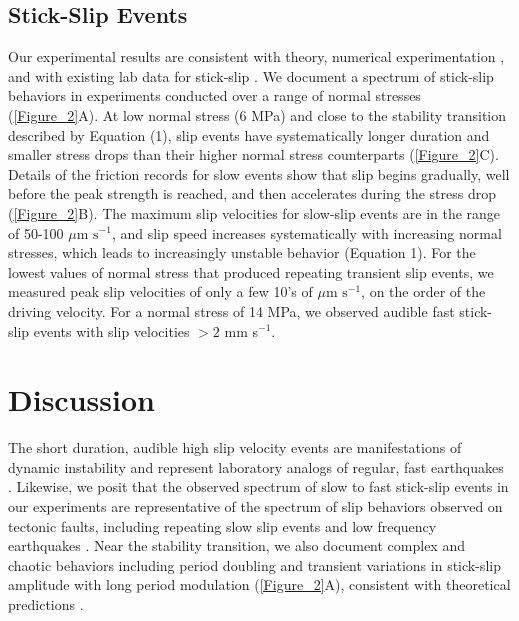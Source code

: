 \subsection{Stick-Slip Events}
Our experimental results are consistent with theory, numerical experimentation \cite{liu2007spontaneous,gu1984slip}, and with existing lab data for stick-slip \cite{Brace_1966}. We document a spectrum of stick-slip behaviors in experiments conducted over a range of normal stresses (\ref{Figure_2}A). At low normal stress (6 MPa) and close to the stability transition described by Equation (1), slip events have systematically longer duration and smaller stress drops than their higher normal stress counterparts (\ref{Figure_2}C). Details of the friction records for slow events show that slip begins gradually, well before the peak strength is reached, and then accelerates during the stress drop (\ref{Figure_2}B).  The maximum slip velocities for slow-slip events are in the range of 50-100 $\mu \text{m s}^{-1}$, and slip speed increases systematically with increasing normal stresses, which leads to increasingly unstable behavior (Equation 1).  For the lowest values of normal stress that produced repeating transient slip events, we measured peak slip velocities of only a few 10's of $\mu \text{m s}^{-1}$, on the order of the driving velocity. For a normal stress of 14 MPa, we observed audible fast stick-slip events with slip velocities $> 2$ mm s$^{-1}$. 

\section{Discussion}
The short duration, audible high slip velocity events are manifestations of dynamic instability and represent laboratory analogs of regular, fast earthquakes \cite{Brace_1966}.  Likewise, we posit that the observed spectrum of slow to fast stick-slip events in our experiments are representative of the spectrum of slip behaviors observed on tectonic faults, including repeating slow slip events and low frequency earthquakes \cite{ide2007scaling, peng2010integrated}. Near the stability transition, we also document complex and chaotic behaviors including period doubling and transient variations in stick-slip amplitude with long period modulation (\ref{Figure_2}A), consistent with theoretical predictions \cite{gu1984slip}.

